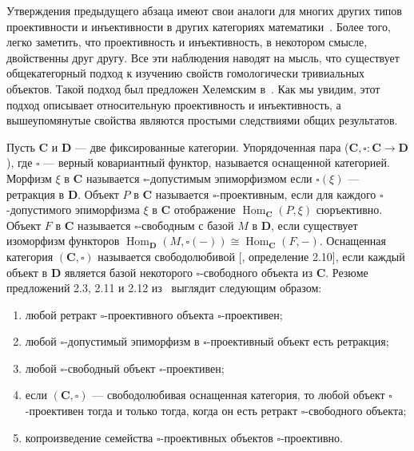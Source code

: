 Утверждения предыдущего абзаца имеют свои аналоги для многих других типов
проективности и инъективности в других категориях
математики~\cite{SemadeniProjInjDual}. Более того, легко заметить, что
проективность и инъективность, в некотором смысле, двойственны друг другу. Все
эти наблюдения наводят на мысль, что существует общекатегорный подход к изучению
свойств гомологически тривиальных объектов. Такой подход был предложен Хелемским
в~\cite{HelMetrFrQMod}. Как мы увидим, этот подход описывает относительную
проективность и инъективность, а вышеупомянутые свойства являются простыми
следствиями общих результатов. 

Пусть $\mathbf{C}$ и $\mathbf{D}$ --- две фиксированные категории. Упорядоченная
пара ($\mathbf{C}, \square:\mathbf{C}\to\mathbf{D}$), где $\square$ --- верный
ковариантный функтор, называется оснащенной категорией. Морфизм $\xi$ в
$\mathbf{C}$ называется $\square$-допустимым эпиморфизмом если $\square (\xi)$
--- ретракция в $\mathbf{D}$. Объект $P$ в $\mathbf{C}$ называется
$\square$-проективным, если для каждого $\square$-допустимого эпиморфизма $\xi$
в $\mathbf{C}$ отображение $\operatorname{Hom}_{\mathbf{C}}(P,\xi)$ сюръективно.
Объект $F$ в $\mathbf{C}$ называется $\square$-свободным с базой $M$ в
$\mathbf{D}$, если существует изоморфизм функторов
$\operatorname{Hom}_{\mathbf{D}}(M,\square(-))
\cong\operatorname{Hom}_{\mathbf{C}}(F,-)$.
Оснащенная категория $(\mathbf{C},\square)$ называется свободолюбивой
[\cite{HelMetrFrQMod}, определение 2.10], если каждый объект в $\mathbf{D}$
является базой некоторого $\square$-свободного объекта из $\mathbf{C}$. Резюме
предложений 2.3, 2.11  и 2.12 из~\cite{HelMetrFrQMod} выглядит следующим
образом:
\begin{enumerate}[label = (\roman*)]
    \item любой ретракт $\square$-проективного объекта $\square$-проективен;

    \item любой $\square$-допустимый эпиморфизм в $\square$-проективный объект
    есть ретракция;

    \item любой $\square$-свободный объект $\square$-проективен;

    \item если $(\mathbf{C},\square)$ --- свободолюбивая оснащенная категория,
    то любой объект $\square$-проективен тогда и только тогда, когда он есть
    ретракт $\square$-свободного объекта;

    \item копроизведение семейства $\square$-проективных объектов
    $\square$-проективно.
\end{enumerate}

